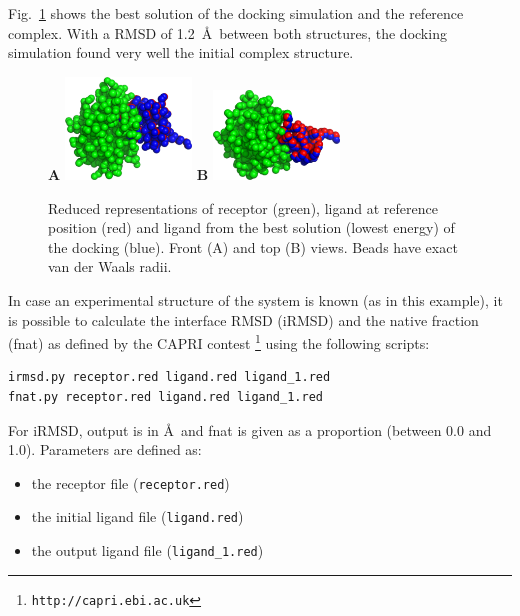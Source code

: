 \documentclass[12pt,a4paper]{article}
\begin{document}
Fig.~\ref{1CGI_dock} shows the best solution of the docking simulation and the
reference complex. With a RMSD of 1.2~\AA\ between both structures, 
the docking simulation found very well the initial complex structure.

\begin{figure}[htbp]
\center
{\textbf A}
\includegraphics*[width=0.30\textwidth]{img/1CGI_dock1_front.png}
\hspace*{2cm}
{\textbf B}
\includegraphics*[width=0.30\textwidth]{img/1CGI_dock1_top.png}
\caption{Reduced representations of receptor (green), ligand at reference 
position (red) and ligand from the best solution (lowest energy) of the 
docking (blue). Front (A) and top (B) views. Beads have exact van der 
Waals radii.}
\label{1CGI_dock}
\end{figure}


In case an experimental structure of the system is known (as in this example), 
it is possible to calculate the interface RMSD (iRMSD) and the native fraction 
(fnat) as defined by the CAPRI contest \footnote{\tt http://capri.ebi.ac.uk}
using the following scripts:

\begin{verbatim}
irmsd.py receptor.red ligand.red ligand_1.red
fnat.py receptor.red ligand.red ligand_1.red
\end{verbatim}

For iRMSD, output is in \AA\ and fnat is given as a proportion (between 0.0 and 1.0). Parameters are defined as:
\begin{itemize}
\item the receptor file ({\tt receptor.red})
\item the initial ligand file ({\tt ligand.red})
\item the output ligand file ({\tt ligand\_1.red})
\end{itemize}
\end{document}
